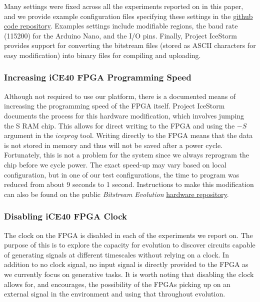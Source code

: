 \documentclass{ieeeaccess}
\begin{document}
Many settings were fixed across all the experiments reported on in this paper, and we provide example configuration files specifying these settings in the \href{https://github.com/evolvablehardware/BitstreamEvolution}{github code repository}. Examples settings include modifiable regions, the baud rate (115200) for the Arduino Nano, and the I/O pins. Finally, Project IceStorm provides support for converting the bitstream files (stored as ASCII characters for easy modification) into binary files for compiling and uploading.%

\subsubsection{Increasing iCE40 FPGA Programming Speed}
Although not required to use our platform, there is a documented means of increasing the programming speed of the FPGA itself. Project IceStorm documents the process for this hardware modification, which involves jumping the S RAM chip. This allows for direct writing to the FPGA and using the $-S$ argument in the $iceprog$ tool. Writing directly to the FPGA means that the data is not stored in memory and thus will not be saved after a power cycle. Fortunately, this is not a problem for the system since we always reprogram the chip before we cycle power. The exact speed-up may vary based on local configuration, but in one of our test configurations, the time to program was reduced from about 9 seconds to 1 second. Instructions to make this modification can also be found on the public \textit{Bitstream Evolution} \href{https://github.com/evolvablehardware/BitstreamEvolutionHardware}{hardware repository}.



\subsubsection{Disabling  iCE40 FPGA Clock}
The clock on the FPGA is disabled in each of the experiments we report on. The purpose of this is to explore the capacity for evolution to discover circuits capable of generating signals at different timescales without relying on a clock. In addition to no clock signal, no input signal is directly provided to the FPGA as we currently focus on generative tasks. It is worth noting that disabling the clock allows for, and encourages, the possibility of the FPGAs picking up on an external signal in the environment and using that throughout evolution.
\end{document}
